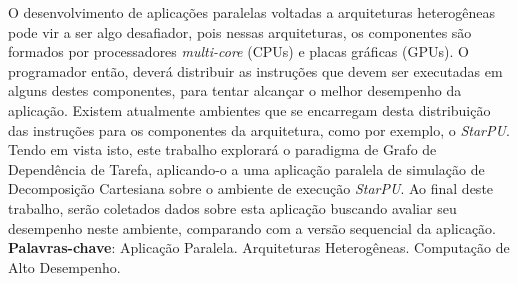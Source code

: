 
\begin{resumo}[RESUMO]
\begin{SingleSpacing}


O desenvolvimento de aplicações paralelas voltadas a arquiteturas heterogêneas pode vir a ser algo desafiador, pois nessas arquiteturas, os componentes são formados por processadores \emph{multi-core} (CPUs) e placas gráficas (GPUs).
O programador então, deverá distribuir as instruções que devem ser executadas em alguns destes componentes, para tentar alcançar o melhor desempenho da aplicação.
Existem atualmente ambientes que se encarregam desta distribuição das instruções para os componentes da arquitetura, como por exemplo, o \emph{StarPU}. 
Tendo em vista isto, este trabalho explorará o paradigma de Grafo de Dependência de Tarefa, aplicando-o a uma aplicação paralela de simulação de Decomposição Cartesiana sobre o ambiente de execução \emph{StarPU}.
Ao final deste trabalho, serão coletados dados sobre esta aplicação buscando avaliar seu desempenho neste ambiente, comparando com a versão sequencial da aplicação.\\

\textbf{Palavras-chave}: Aplicação Paralela. Arquiteturas Heterogêneas. Computação de Alto Desempenho.

\end{SingleSpacing}
\end{resumo}